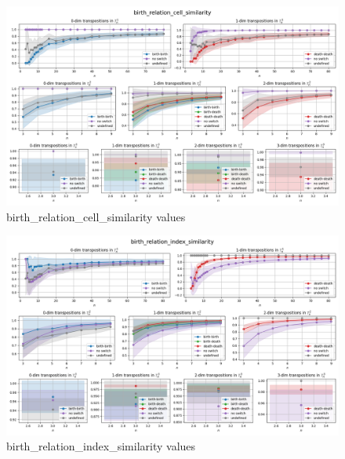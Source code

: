 \documentclass{article}
\begin{document}
\begin{figure}[h!]
    \hspace*{-3cm}
    \centering
    \includegraphics[width=1.5\textwidth]{pics/torus-transpositions/similaritites/score=birth-relation-cell-similarity.png}
    \caption{birth\_relation\_cell\_similarity values}
    \label{fig:birth-relation-cell-similarity}
\end{figure}
\begin{figure}[h!]
    \hspace*{-3cm}
    \centering
    \includegraphics[width=1.5\textwidth]{pics/torus-transpositions/similaritites/score=birth-relation-index-similarity.png}
    \caption{birth\_relation\_index\_similarity values}
    \label{fig:birth-relation-index-similarity}
\end{figure}
\end{document}
